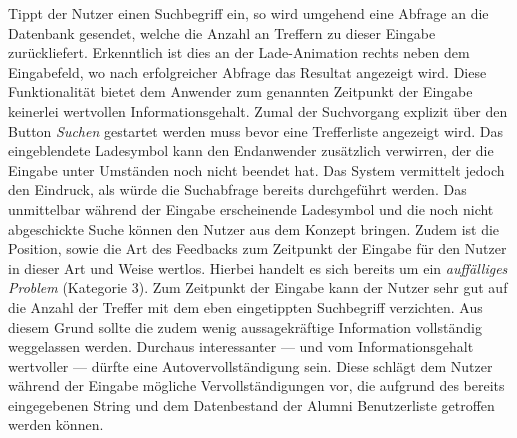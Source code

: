 {
	Tippt der Nutzer einen Suchbegriff ein, so wird umgehend eine Abfrage an die Datenbank gesendet, welche die Anzahl an Treffern zu dieser Eingabe zurückliefert. Erkenntlich ist dies an der Lade-Animation rechts neben dem Eingabefeld, wo nach erfolgreicher Abfrage das Resultat angezeigt wird. Diese Funktionalität bietet dem Anwender zum genannten Zeitpunkt der Eingabe keinerlei wertvollen Informationsgehalt. Zumal der Suchvorgang explizit über den Button \emph{Suchen} gestartet werden muss bevor eine Trefferliste angezeigt wird. Das eingeblendete Ladesymbol kann den Endanwender zusätzlich verwirren, der die Eingabe unter Umständen noch nicht beendet hat. Das System vermittelt jedoch den Eindruck, als würde die Suchabfrage bereits durchgeführt werden.
}
{
	Das unmittelbar während der Eingabe erscheinende Ladesymbol und die noch nicht abgeschickte Suche können den Nutzer aus dem Konzept bringen. Zudem ist die Position, sowie die Art des Feedbacks zum Zeitpunkt der Eingabe für den Nutzer in dieser Art und Weise wertlos. Hierbei handelt es sich bereits um ein \emph{auffälliges Problem} (Kategorie 3).
}
{
	Zum Zeitpunkt der Eingabe kann der Nutzer sehr gut auf die Anzahl der Treffer mit dem eben eingetippten Suchbegriff verzichten. Aus diesem Grund sollte die zudem wenig aussagekräftige Information vollständig weggelassen werden. Durchaus interessanter --- und vom Informationsgehalt wertvoller --- dürfte eine Autovervollständigung sein. Diese schlägt dem Nutzer während der Eingabe mögliche Vervollständigungen vor, die aufgrund des bereits eingegebenen String und dem Datenbestand der Alumni Benutzerliste getroffen werden können.
} 

